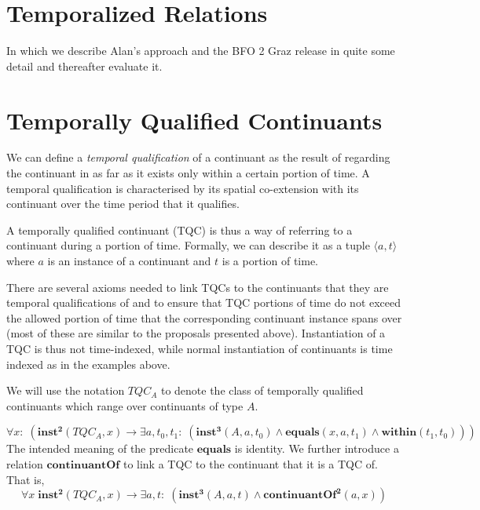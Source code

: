 \documentclass[10pt]{bmc_article}
\newcommand{\mirel}[1]{\ensuremath{\mathrm{\mathbf{#1}}}}
\newcommand{\mclass}[1]{\ensuremath{\mathit{#1}}}
\newcommand{\mrel}[2]{\mirel{#1^#2}}
\newcommand{\mrelb}[1]{\mrel{#1}{2}}
\newcommand{\mrelt}[1]{\mrel{#1}{3}}
\newcommand{\pair}[2]{\ensuremath{\langle #1,#2\rangle}}
\newcommand{\TQC}[1]{\ensuremath{TQC_{\mclass{#1}}}}
\newenvironment{bmcformat}{\baselineskip20pt\sloppy\setboolean{publ}{false}}{\baselineskip20pt\sloppy}
\begin{document}
\begin{bmcformat}
\section*{Temporalized Relations}

In which we describe Alan's approach and the BFO 2 Graz release in quite some detail and thereafter evaluate it. 






\section*{Temporally Qualified Continuants}

We can define a \emph{temporal qualification} of a
continuant as the result of regarding the continuant in as far as it exists only
within a certain portion of time. A temporal qualification is 
characterised by its spatial co-extension with its continuant over the time
period that it qualifies.

A temporally qualified continuant (TQC) is thus a way of referring to a continuant
during a portion of time. Formally, we can describe it as a tuple \pair{a}{t}
where $a$ is an instance
of a continuant and $t$ is a portion of time. 

There are several axioms needed to link TQCs to the continuants that they are
temporal qualifications of and to ensure that TQC portions of time do not exceed the
allowed portion of time that the corresponding continuant instance spans over
(most of these are similar to the proposals presented above).
Instantiation of a TQC is thus not time-indexed, while normal instantiation of
continuants is time indexed as in the examples above. 


We will use the notation \TQC{A} to denote the class of temporally qualified
continuants which range over continuants of type \mclass{A}.

\begin{equation}
\forall x:\; (\mrelb{inst}(\TQC{A},x) \rightarrow \exists a,t_0,t_1:\;(
\mrelt{inst}(\mclass{A},a,t_0) \wedge \mirel{equals}(x,a,t_1) \wedge
\mirel{within}(t_1,t_0)))
\end{equation}
The intended meaning of the predicate \mirel{equals} is identity.  
We further introduce a relation \mirel{continuantOf} to link a TQC to the continuant
that it is a TQC of. That is, 
\begin{equation}
\forall x\; \mrelb{inst}(\TQC{A},x) \rightarrow \exists a,t:\;(
\mrelt{inst}(\mclass{A}, a,t) \wedge \mrelb{continuantOf}(a,x))
\end{equation}


\end{bmcformat}
\end{document}
